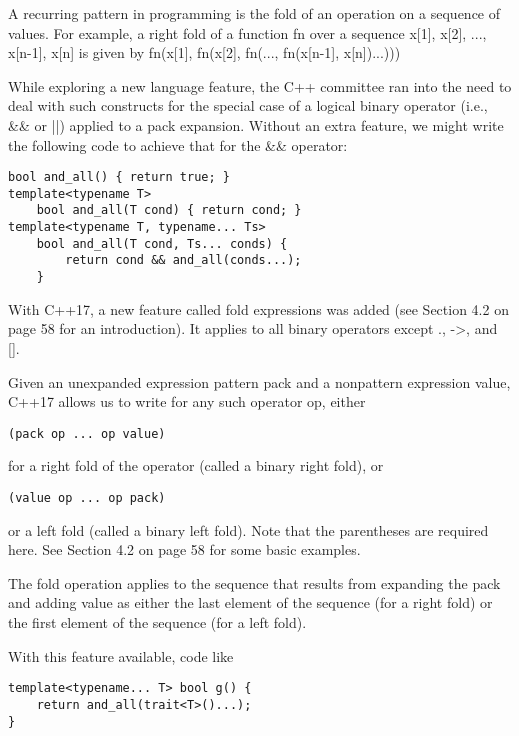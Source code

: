 
A recurring pattern in programming is the fold of an operation on a sequence of values. For example, a right fold of a function fn over a sequence x[1], x[2], ..., x[n-1], x[n] is given by fn(x[1], fn(x[2], fn(..., fn(x[n-1], x[n])...)))

While exploring a new language feature, the C++ committee ran into the need to deal with such constructs for the special case of a logical binary operator (i.e., \&\& or ||) applied to a pack expansion. Without an extra feature, we might write the following code to achieve that for the \&\& operator:

\begin{lstlisting}[style=styleCXX]
bool and_all() { return true; }
template<typename T>
	bool and_all(T cond) { return cond; }
template<typename T, typename... Ts>
	bool and_all(T cond, Ts... conds) {
		return cond && and_all(conds...);
	}
\end{lstlisting}

With C++17, a new feature called fold expressions was added (see Section 4.2 on page 58 for an introduction). It applies to all binary operators except ., ->, and [].

Given an unexpanded expression pattern pack and a nonpattern expression value, C++17 allows us to write for any such operator op, either

\begin{lstlisting}[style=styleCXX]
(pack op ... op value)
\end{lstlisting}

for a right fold of the operator (called a binary right fold), or

\begin{lstlisting}[style=styleCXX]
(value op ... op pack)
\end{lstlisting}

or a left fold (called a binary left fold). Note that the parentheses are required here. See Section 4.2 on page 58 for some basic examples.

The fold operation applies to the sequence that results from expanding the pack and adding value as either the last element of the sequence (for a right fold) or the first element of the sequence (for a left fold).

With this feature available, code like

\begin{lstlisting}[style=styleCXX]
template<typename... T> bool g() {
	return and_all(trait<T>()...);
}
\end{lstlisting}

